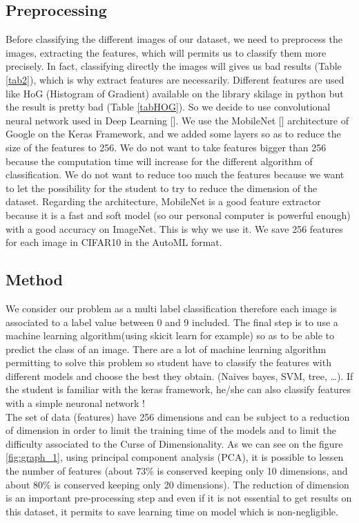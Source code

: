 \documentclass[10pt, a4paper, twocolumn]{article} %
\begin{document}
\subsection{Preprocessing}
Before classifying the different images of our dataset, we need to preprocess the images, extracting the features, which will permits us to classify them more precisely. In fact, classifying directly the images will gives us bad results (Table \ref{tab2}), which is why extract features are necessarily.  Different features are used like HoG (Histogram of Gradient) available on the library skilage in python but the result is pretty bad (Table \ref{tabHOG}). So we decide to use convolutional neural network used in Deep Learning [\cite{2}].  We use the MobileNet [\cite{3}] architecture of Google on the Keras Framework, and we added some layers so as to reduce the size of the features to 256. We do not want to take features bigger than 256 because the computation time will increase for the different algorithm of classification. We do not want to reduce too much the features because we want to let the possibility for the student to try to reduce the dimension of the dataset.  Regarding the architecture, MobileNet is a good feature extractor because it is a fast and soft model (so our personal computer is powerful enough) with a good accuracy on ImageNet. This is why we use it. We save 256 features for each image in CIFAR10 in the AutoML format. 

\subsection{Method}
We consider our problem as a multi label classification therefore each image is associated to a label value between 0 and 9 included. The final step is to use a machine learning algorithm(using skicit learn for example) so as to be able to predict the class of an image. There are a lot of machine learning algorithm permitting to solve this problem so student have to classify the features with different models and choose the best they obtain. (Naives bayes, SVM, tree, …).
If the student is familiar with the keras framework, he/she can also classify features with a simple neuronal network ! \\The set of data (features) have 256 dimensions and can be subject to a reduction of dimension in order to limit the training time of the models and to limit the difficulty associated to the Curse of Dimensionality. As we can see on the figure \ref{fig:graph_1}, using  principal component analysis (PCA), it is possible to lessen the number of features (about $73\%$ is conserved keeping only 10 dimensions, and about $80\%$ is conserved keeping only 20 dimensions). The reduction of dimension is an important pre-processing step and even if it is not essential to get
results on this dataset, it permits to save learning time on model which is non-negligible.
\\
\end{document}
